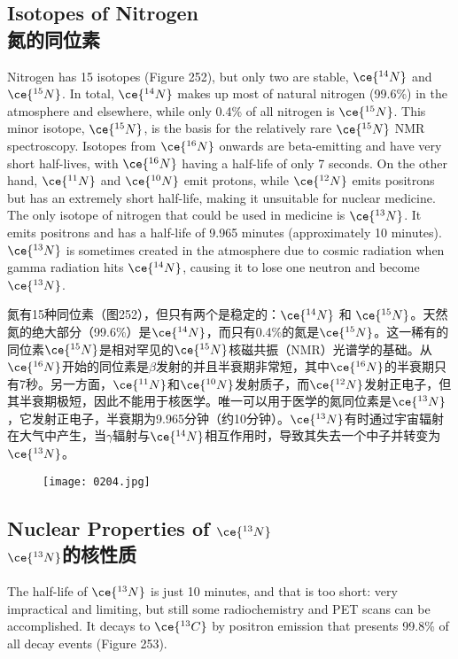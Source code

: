 \documentclass[dvipsnames, svgnames,a4paper,11pt]{article}
\begin{document}
\subsection{Isotopes of Nitrogen \\氮的同位素}  
Nitrogen has 15 isotopes (Figure 252), but only two are stable, \(\ce{^{14}N}\) and \(\ce{^{15}N}\). In total, \(\ce{^{14}N}\) makes up most of natural nitrogen (99.6\%) in the atmosphere and elsewhere, while only 0.4\% of all nitrogen is \(\ce{^{15}N}\). This minor isotope, \(\ce{^{15}N}\), is the basis for the relatively rare \(\ce{^{15}N}\) NMR spectroscopy. Isotopes from \(\ce{^{16}N}\) onwards are beta-emitting and have very short half-lives, with \(\ce{^{16}N}\) having a half-life of only 7 seconds. On the other hand, \(\ce{^{11}N}\) and \(\ce{^{10}N}\) emit protons, while \(\ce{^{12}N}\) emits positrons but has an extremely short half-life, making it unsuitable for nuclear medicine. The only isotope of nitrogen that could be used in medicine is \(\ce{^{13}N}\). It emits positrons and has a half-life of 9.965 minutes (approximately 10 minutes). \(\ce{^{13}N}\) is sometimes created in the atmosphere due to cosmic radiation when gamma radiation hits \(\ce{^{14}N}\), causing it to lose one neutron and become \(\ce{^{13}N}\).

氮有15种同位素（图252），但只有两个是稳定的：\(\ce{^{14}N}\) 和 \(\ce{^{15}N}\)。天然氮的绝大部分（99.6\%）是\(\ce{^{14}N}\)，而只有0.4\%的氮是\(\ce{^{15}N}\)。这一稀有的同位素\(\ce{^{15}N}\)是相对罕见的\(\ce{^{15}N}\)核磁共振（NMR）光谱学的基础。从\(\ce{^{16}N}\)开始的同位素是\(\beta\)发射的并且半衰期非常短，其中\(\ce{^{16}N}\)的半衰期只有7秒。另一方面，\(\ce{^{11}N}\)和\(\ce{^{10}N}\)发射质子，而\(\ce{^{12}N}\)发射正电子，但其半衰期极短，因此不能用于核医学。唯一可以用于医学的氮同位素是\(\ce{^{13}N}\)，它发射正电子，半衰期为9.965分钟（约10分钟）。\(\ce{^{13}N}\)有时通过宇宙辐射在大气中产生，当$\gamma$辐射与\(\ce{^{14}N}\)相互作用时，导致其失去一个中子并转变为\(\ce{^{13}N}\)。

\begin{figure}[h]
	\centering
    \texttt{[image: 0204.jpg]}  
     \label{fig252}
\end{figure}

\subsection{Nuclear Properties of \(\ce{^{13}N}\)\\ \(\ce{^{13}N}\)的核性质}  
The half-life of \(\ce{^{13}N}\) is just 10 minutes, and that is too short: very impractical and limiting, but still some radiochemistry and PET scans can be accomplished. It decays to \(\ce{^{13}C}\) by positron emission that presents 99.8\% of all decay events (Figure 253).  
\end{document}
